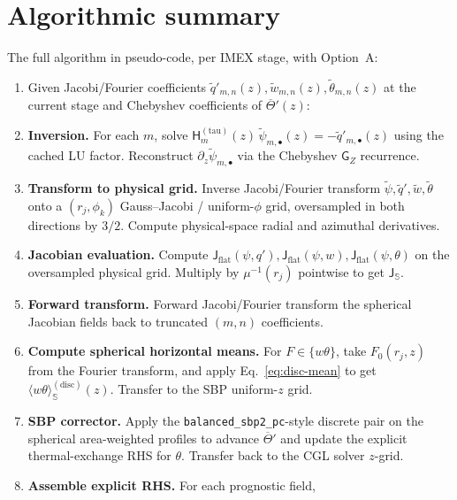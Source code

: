 \documentclass[11pt]{article}
\newcommand{\Jflat}{\mathsf{J}_{\mathrm{flat}}}
\newcommand{\Jsphere}{\mathsf{J}_{\mathbb{S}}}
\newcommand{\meanS}[1]{\langle #1 \rangle_{\mathbb{S}}}
\begin{document}
\section{Algorithmic summary}

The full algorithm in pseudo-code, per IMEX stage, with Option~A:

\begin{enumerate}[leftmargin=2em,itemsep=3pt]
  \item Given Jacobi/Fourier coefficients $\widetilde{q}'_{m, n}(z),
  \widetilde{w}_{m, n}(z), \widetilde{\theta}_{m, n}(z)$ at the
  current stage and Chebyshev coefficients of $\overline{\Theta}'(z)$:
  \item \textbf{Inversion.}  For each $m$, solve
  $\mathsf{H}_{m}^{(\mathrm{tau})}(z)\,\widetilde{\psi}_{m,\bullet}(z)
  = -\widetilde{q}'_{m,\bullet}(z)$ using the cached LU factor.
  Reconstruct $\partial_{z}\widetilde{\psi}_{m,\bullet}$ via the
  Chebyshev $\mathsf{G}_{Z}$ recurrence.
  \item \textbf{Transform to physical grid.}  Inverse Jacobi/Fourier
  transform $\widetilde{\psi}, \widetilde{q}', \widetilde{w},
  \widetilde{\theta}$ onto a $(r_{j}, \phi_{k})$ Gauss--Jacobi /
  uniform-$\phi$ grid, oversampled in both directions by $3/2$.
  Compute physical-space radial and azimuthal derivatives.
  \item \textbf{Jacobian evaluation.}  Compute
  $\Jflat(\psi, q'), \Jflat(\psi, w), \Jflat(\psi, \theta)$ on the
  oversampled physical grid.  Multiply by $\mu^{-1}(r_{j})$ pointwise
  to get $\Jsphere$.
  \item \textbf{Forward transform.}  Forward Jacobi/Fourier transform
  the spherical Jacobian fields back to truncated $(m, n)$
  coefficients.
  \item \textbf{Compute spherical horizontal means.}  For
  $F \in \{w\theta\}$, take $F_{0}(r_{j}, z)$ from the Fourier
  transform, and apply Eq.~\eqref{eq:disc-mean} to get
  $\meanS{w\theta}^{(\mathrm{disc})}(z)$.  Transfer to the SBP
  uniform-$z$ grid.
  \item \textbf{SBP corrector.}  Apply the
  \verb|balanced_sbp2_pc|-style discrete pair on the spherical
  area-weighted profiles to advance $\overline{\Theta}'$ and update
  the explicit thermal-exchange RHS for $\theta$.  Transfer back to
  the CGL solver $z$-grid.
  \item \textbf{Assemble explicit RHS.}  For each prognostic field,

\end{enumerate}
\end{document}
